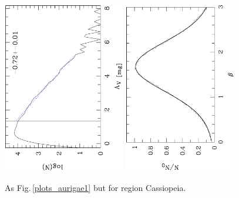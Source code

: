 \documentclass[useAMS,usenatbib]{mn2e}
\begin{document}
\begin{appendix}
\begin{figure}
\includegraphics[height=7.5cm,angle=-90]{av_dist_cassiopea.ps}
\hfill
\includegraphics[height=7.5cm,angle=-90]{histo_cassiopea.ps}
\caption{\label{plots_cassiopea} As Fig.\,\ref{plots_aurigae1} but for region
Cassiopeia.}  
\end{figure}


\end{appendix}
\end{document}
